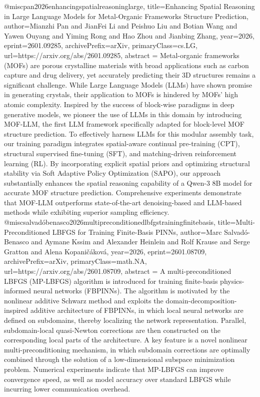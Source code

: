 {}@misc{pan2026enhancingspatialreasoninglarge,
      title={Enhancing Spatial Reasoning in Large Language Models for Metal-Organic Frameworks Structure Prediction}, 
      author={Mianzhi Pan and JianFei Li and Peishuo Liu and Botian Wang and Yawen Ouyang and Yiming Rong and Hao Zhou and Jianbing Zhang},
      year={2026},
      eprint={2601.09285},
      archivePrefix={arXiv},
      primaryClass={cs.LG},
      url={https://arxiv.org/abs/2601.09285},
      abstract = {Metal-organic frameworks (MOFs) are porous crystalline materials with broad applications such as carbon capture and drug delivery, yet accurately predicting their 3D structures remains a significant challenge. While Large Language Models (LLMs) have shown promise in generating crystals, their application to MOFs is hindered by MOFs' high atomic complexity. Inspired by the success of block-wise paradigms in deep generative models, we pioneer the use of LLMs in this domain by introducing MOF-LLM, the first LLM framework specifically adapted for block-level MOF structure prediction. To effectively harness LLMs for this modular assembly task, our training paradigm integrates spatial-aware continual pre-training (CPT), structural supervised fine-tuning (SFT), and matching-driven reinforcement learning (RL). By incorporating explicit spatial priors and optimizing structural stability via Soft Adaptive Policy Optimization (SAPO), our approach substantially enhances the spatial reasoning capability of a Qwen-3 8B model for accurate MOF structure prediction. Comprehensive experiments demonstrate that MOF-LLM outperforms state-of-the-art denoising-based and LLM-based methods while exhibiting superior sampling efficiency.}
}@misc{salvadóbenasco2026multipreconditionedlbfgstrainingfinitebasis,
      title={Multi-Preconditioned LBFGS for Training Finite-Basis PINNs}, 
      author={Marc Salvadó-Benasco and Aymane Kssim and Alexander Heinlein and Rolf Krause and Serge Gratton and Alena Kopaničáková},
      year={2026},
      eprint={2601.08709},
      archivePrefix={arXiv},
      primaryClass={math.NA},
      url={https://arxiv.org/abs/2601.08709},
      abstract = {A multi-preconditioned LBFGS (MP-LBFGS) algorithm is introduced for training finite-basis physics-informed neural networks (FBPINNs). The algorithm is motivated by the nonlinear additive Schwarz method and exploits the domain-decomposition-inspired additive architecture of FBPINNs, in which local neural networks are defined on subdomains, thereby localizing the network representation. Parallel, subdomain-local quasi-Newton corrections are then constructed on the corresponding local parts of the architecture. A key feature is a novel nonlinear multi-preconditioning mechanism, in which subdomain corrections are optimally combined through the solution of a low-dimensional subspace minimization problem. Numerical experiments indicate that MP-LBFGS can improve convergence speed, as well as model accuracy over standard LBFGS while incurring lower communication overhead.}
}
